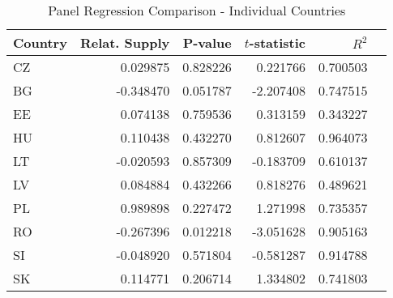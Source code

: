 \documentclass[11pt]{article}
\begin{document}
\begin{table}[!htbp]
\centering 
\caption{Panel Regression Comparison - Individual Countries}
\label{regression_individual_countries}
\begin{center}


\begin{tabular}{lrrrrr}
\toprule
Country &  Relat. Supply &   P-value &    $t$-statistic &  $R^{2}$ \\
\midrule
     CZ &    0.029875 &  0.828226 &  0.221766 &   0.700503 \\
     BG &   -0.348470 &  0.051787 & -2.207408 &   0.747515 \\
     EE &    0.074138 &  0.759536 &  0.313159 &   0.343227 \\
     HU &    0.110438 &  0.432270 &  0.812607 &   0.964073 \\
     LT &   -0.020593 &  0.857309 & -0.183709 &   0.610137 \\
     LV &    0.084884 &  0.432266 &  0.818276 &   0.489621 \\
     PL &    0.989898 &  0.227472 &  1.271998 &   0.735357 \\
     RO &   -0.267396 &  0.012218 & -3.051628 &   0.905163 \\
     SI &   -0.048920 &  0.571804 & -0.581287 &   0.914788 \\
     SK &    0.114771 &  0.206714 &  1.334802 &   0.741803 \\
\bottomrule
\end{tabular}

\end{center}
\end{table}
\end{document}
